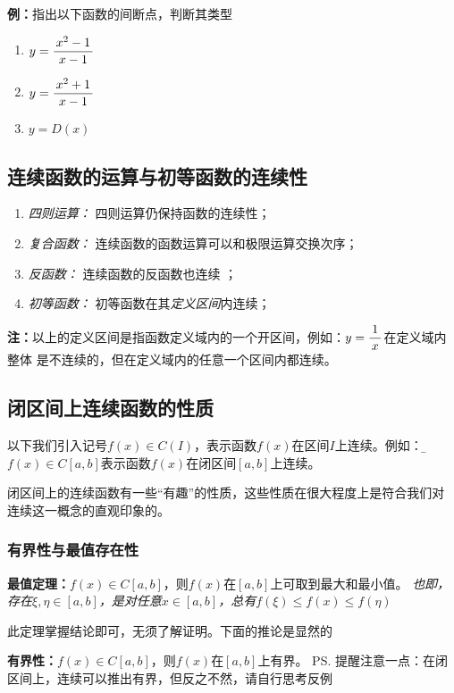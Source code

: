 {\bf 例：}指出以下函数的间断点，判断其类型
\begin{enumerate}[(1)]
  \setlength{\itemindent}{1cm}
  \item $y=\displaystyle\frac{\,{x^2-1}\,}{\,{x-1}\,}$
  \item $y=\displaystyle\frac{\,{x^2+1}\,}{\,{x-1}\,}$
  \item $y=D(x)$
\end{enumerate}

\subsection{连续函数的运算与初等函数的连续性}

\begin{enumerate}[(1)]
  \setlength{\itemindent}{1cm}
  \item {\it 四则运算：} 四则运算仍保持函数的连续性； 
  \item {\it 复合函数：} 连续函数的函数运算可以和极限运算交换次序； 
  \item {\it 反函数：} 连续函数的反函数也连续 ；
  \item {\it 初等函数：} 初等函数在其{\it 定义区间}内连续；
\end{enumerate}

{\bf 注：}以上的定义区间是指函数定义域内的一个开区间，例如：$y=\displaystyle\frac{\,{1}\,}{\,{x}\,}$在定义域内整体
是不连续的，但在定义域内的任意一个区间内都连续。

\subsection{闭区间上连续函数的性质}

以下我们引入记号$f(x)\in C(I)$，表示函数$f(x)$在区间$I$上连续。例如：
{\b$f(x)\in C[a,b]$表示函数$f(x)$在闭区间$[a,b]$上连续}。

闭区间上的连续函数有一些“有趣”的性质，这些性质在很大程度上是符合我们对
连续这一概念的直观印象的。

\subsubsection{有界性与最值存在性}

{\bf 最值定理：}$f(x)\in C[a,b]$，则$f(x)$在$[a,b]$上可取到最大和最小值。
{\it 也即，存在$\xi,\eta\in[a,b]$，是对任意$x\in[a,b]$，总有$f(\xi)
\leq f(x)\leq f(\eta)$}

此定理掌握结论即可，无须了解证明。下面的推论是显然的

{\bf 有界性：}$f(x)\in C[a,b]$，则$f(x)$在$[a,b]$上有界。
\ps{提醒注意一点：在闭区间上，连续可以推出有界，但反之不然，请自行思考反例}

